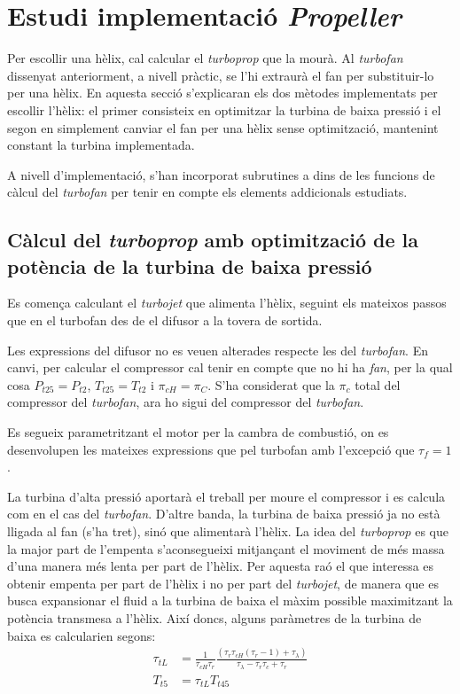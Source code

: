 \section{Estudi implementació \textit{Propeller}}
Per escollir una hèlix, cal calcular el \textit{ turboprop} que la mourà. Al \textit{turbofan} dissenyat anteriorment, a nivell pràctic, se l'hi extraurà el fan per substituir-lo per una hèlix. En aquesta secció s'explicaran els dos mètodes implementats per escollir l'hèlix: el primer consisteix en optimitzar la turbina de baixa pressió i el segon en simplement canviar el fan per una hèlix sense optimització, mantenint constant la turbina implementada.

\noindent A nivell d'implementació, s'han incorporat subrutines a dins de les funcions de càlcul del \textit{turbofan} per tenir en compte els elements addicionals estudiats.
\subsection{Càlcul del \textit{turboprop} amb optimització de la potència de la turbina de baixa pressió}
Es comença calculant el \textit{turbojet} que alimenta l'hèlix, seguint els mateixos passos que en el turbofan des de el difusor a la tovera de sortida.

\noindent Les expressions del difusor no es veuen alterades respecte les del \textit{turbofan}. En canvi, per calcular el compressor cal tenir en compte que no hi ha \textit{fan}, per la qual cosa $P_{t25}=P_{t2}$, $T_{t25}=T_{t2}$ i $\pi_{cH}=\pi_{C}$. S'ha considerat que la $\pi_c$ total del compressor del \textit{turbofan}, ara ho sigui del compressor del \textit{turbofan}.

\noindent Es segueix parametritzant el motor per la cambra de combustió, on es desenvolupen les mateixes expressions que pel turbofan amb l'excepció que $\tau_f=1$.

\noindent La turbina d'alta pressió aportarà el treball per moure el compressor i es calcula com en el cas del \textit{turbofan}. D'altre banda, la turbina de baixa pressió ja no està lligada al fan (s'ha tret), sinó que alimentarà l'hèlix. La idea del \textit{turboprop} es que la major part de l'empenta s'aconsegueixi mitjançant el moviment de més massa d'una manera més lenta per part de l'hèlix. Per aquesta raó el que interessa es obtenir empenta per part de l'hèlix i no per part del \textit{turbojet}, de manera que es busca expansionar el fluid a la turbina de baixa el màxim possible maximitzant la potència transmesa a l'hèlix. 
\noindent Així doncs, alguns paràmetres de la turbina de baixa es calcularien segons:
\begin{align}
	\tau_{tL}&=\frac{1}{\tau_{cH}\tau_r}\frac{(\tau_r\tau_{cH}(\tau_r-1)+\tau_\lambda)}{\tau_\lambda-\tau_r\tau_{c}+\tau_r}\label{turboprop_turbopt}\\
	T_{t5}&=\tau_{tL}T_{t45}
\end{align}


